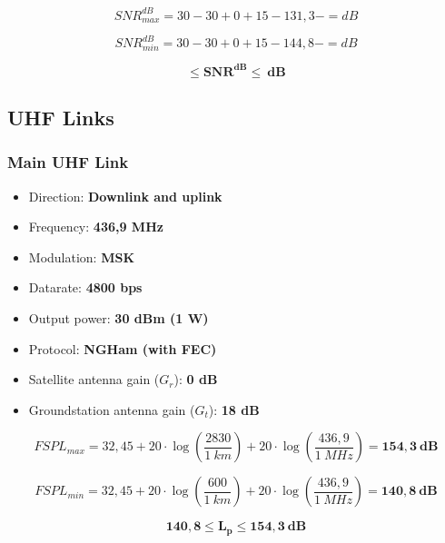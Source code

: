 \begin{equation}
SNR^{dB}_{max} = 30 - 30 + 0 + 15 - 131,3 - = dB
\end{equation}

\begin{equation}
SNR^{dB}_{min} = 30 - 30 + 0 + 15 - 144,8 - = dB
\end{equation}

\begin{equation}
\mathbf{ \leq SNR^{dB} \leq \ dB}
\end{equation}

\subsection{UHF Links}

\subsubsection{Main UHF Link}

\begin{itemize}
    \item Direction: \textbf{Downlink and uplink}
    \item Frequency: \textbf{436,9 MHz}
    \item Modulation: \textbf{MSK}
    \item Datarate: \textbf{4800 bps}
    \item Output power: \textbf{30 dBm (1 W)}
    \item Protocol: \textbf{NGHam (with FEC)}
    \item Satellite antenna gain ($G_{r}$): \textbf{0 dB}
    \item Groundstation antenna gain ($G_{t}$): \textbf{18 dB}
\end{itemize}

\begin{equation}
FSPL_{max} = 32,45 + 20\cdot \log\left(\frac{2830}{1\ km}\right) + 20\cdot \log\left(\frac{436,9}{1\ MHz}\right) = \mathbf{154,3\ dB}
\end{equation}

\begin{equation}
FSPL_{min} = 32,45 + 20\cdot \log\left(\frac{600}{1\ km}\right) + 20\cdot \log\left(\frac{436,9}{1\ MHz}\right) = \mathbf{140,8\ dB}
\end{equation}

\begin{equation}
\mathbf{140,8 \leq L_{p} \leq 154,3\ dB}
\end{equation}

